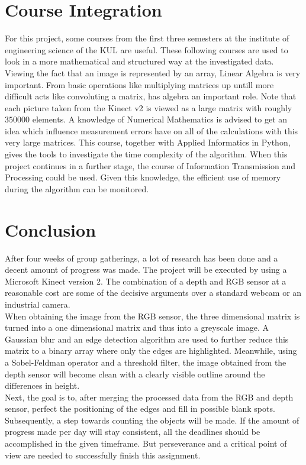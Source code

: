 \documentclass[11pt]{article}
\begin{document}
\section{Course Integration}
For this project, some courses from the first three semesters at the institute of engineering science of the KUL are useful. These following courses are used to look in a more mathematical and structured way at the investigated data.\\
Viewing the fact that an image is represented by an array, Linear Algebra is very important. From basic operations like multiplying matrices up untill more difficult acts like convoluting a matrix, has algebra an important role. Note that each picture taken from the Kinect v2 is viewed as a large matrix with roughly $350 000$ elements. A knowledge of Numerical Mathematics is advised to get an idea which influence measurement errors have on all of the calculations with this very large matrices. This course, together with Applied Informatics in Python, gives the tools to investigate the time complexity of the algorithm. When this project continues in a further stage, the course of Information Transmission and Processing could be used. Given this knowledge, the efficient use of memory during the algorithm can be monitored.


\section{Conclusion}

After four weeks of group gatherings, a lot of research has been done and a decent amount of progress was made. The project will be executed by using a Microsoft Kinect version 2. The combination of a depth and RGB sensor at a reasonable cost are some of the decisive arguments over a standard webcam or an industrial camera. \\
When obtaining the image from the RGB sensor, the three dimensional matrix is turned into a one dimensional matrix and thus into a greyscale image. A Gaussian blur and an edge detection algorithm are used to further reduce this matrix to a binary array where only the edges are highlighted. Meanwhile, using a Sobel-Feldman operator and a threshold filter, the image obtained from the depth sensor will become clean with a clearly visible outline around the differences in height. \\
Next, the goal is to, after merging the processed data from the RGB and depth sensor, perfect the positioning of the edges and fill in possible blank spots. Subsequently, a step towards counting the objects will be made. If the amount of progress made per day will stay consistent, all the deadlines should be  accomplished in the given timeframe. But perseverance and a critical point of view are needed to successfully finish this assignment. 
\end{document}
